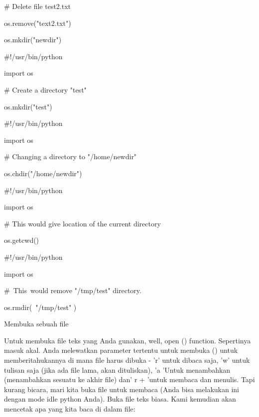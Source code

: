 \vspace{12pt}
 $  \#  $ Delete file test2.txt \par
os.remove("text2.txt") \par
\vspace{12pt}
os.mkdir("newdir") \par
\vspace{12pt}
 $  \#  $!/usr/bin/python \par
import os \par
\vspace{12pt}
 $  \#  $ Create a directory "test" \par
os.mkdir("test") \par
\vspace{12pt}
 $  \#  $!/usr/bin/python \par
import os \par
\vspace{12pt}
 $  \#  $ Changing a directory to "/home/newdir" \par
os.chdir("/home/newdir") \par
\vspace{12pt}
 $  \#  $!/usr/bin/python \par
import os \par
\vspace{12pt}
 $  \#  $ This would give location of the current directory \par
os.getcwd() \par
\vspace{12pt}
 $  \#  $!/usr/bin/python \par
import os \par
\vspace{12pt}
 $  \#  $~This~would  remove "/tmp/test"  directory. \par
os.rmdir(~"/tmp/test"  ) \par
\vspace{12pt}
\vspace{12pt}
Membuka sebuah file \par
\vspace{12pt}
Untuk membuka file teks yang Anda gunakan, well, open () function. Sepertinya masuk akal. Anda melewatkan parameter tertentu untuk membuka () untuk memberitahukannya di mana file harus dibuka - 'r' untuk dibaca saja, 'w' untuk tulisan saja (jika ada file lama, akan dituliskan), 'a 'Untuk menambahkan (menambahkan sesuatu ke akhir file) dan' r + 'untuk membaca dan menulis. Tapi kurang bicara, mari kita buka file untuk membaca (Anda bisa melakukan ini dengan mode idle python Anda). Buka file teks biasa. Kami kemudian akan mencetak apa yang kita baca di dalam file: \par
